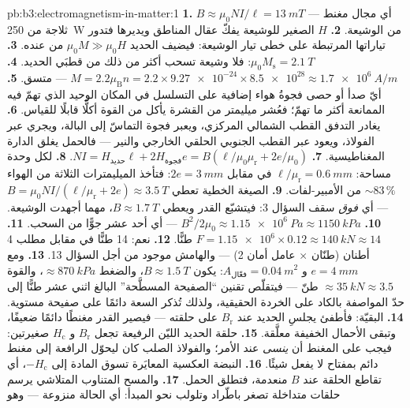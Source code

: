 \begin{solution}{pb:b3:electromagnetism-in-matter:1}
\textbf{1.} $B \approx \mu_0NI/\ell = \qty{13}{mT}$ --- أي
مجال مغنط ثلاجة من \qty{250}{W} من الوشيعة.
\textbf{2.} $H$ الصغير للوشيعة يفكّ عقال المناطق ويديرها فتدور
تياراتها المرتبطة على خطى تيار الوشيعة: فيضيف الحديد
$\mu_0M \gg \mu_0H$ من عنده.
\textbf{3.} $\mu_0M_{\text{s}} = \qty{2.1}{T}$: فلا وشيعة تسحب
أكثر من ذلك من قطبَي الحديد.
\textbf{4.} $M = 2.2\mu_{\text{B}}n = 2.2\times\num{9.27e-24}
\times\num{8.5e28} \approx \qty{1.7e6}{A/m}$ --- متسق.
\textbf{5.} أيّ صدأ أو حصى فجوةُ هواء إضافية على التسلسل في المكان
الوحيد الذي تهمّ فيه الممانعة أكثر ما تهمّ؛ فعُشر ميليمتر من القشرة
يأكل من القوة أكلًّا قابلًا للقياس.
\textbf{6.} يغادر التدفق القطب الشمالي المركزي، ويعبر
فجوة التماسّ إلى البالة، ويجري عبر الفولاذ، ويعود
عبر القطب الجنوبي الحلقي الخارجي والنير --- فالحمل
يغلق الدارة المغناطيسية.
\textbf{7.} $NI = H_{\text{حديد}}\ell + 2H_{\text{فجوة}}e =
B(\ell/\mu_0\mu_{\text{r}} + 2e/\mu_0)$.
\textbf{8.} لكل وحدة مساحة: $\ell/\mu_{\text{r}} = \qty{0.6}{mm}$
في مقابل $2e = \qty{3}{mm}$: فتأخذ الميليمترات الثلاثة من الهواء
$\sim83\,\%$ من الأمبير-لفات.
\textbf{9.} الصيغة الخطية تعطي $B = \mu_0NI/(\ell/
\mu_{\text{r}} + 2e) \approx \qty{3.5}{T}$ --- أي \emph{فوق}
سقف السؤال 3: فيتشبّع القدر ويعطي $B \approx
\qty{1.7}{T}$، مهما أجهدت الوشيعة.
\textbf{10.} $B^2/2\mu_0 \approx \qty{1.15e6}{Pa} \approx
\qty{1150}{kPa}$ --- أي أحد عشر جوًّا من السحب.
\textbf{11.} $F = \num{1.15e6}\times0.12 \approx \qty{140}{kN}
\approx 14$ طنًّا.
\textbf{12.} نعم: 14 طنًّا في مقابل مطلب 4 أطنان
(طنّان $\times$ عامل أمان 2) --- والهامش موجود من أجل
السؤال 13.
\textbf{13.} ومع $e = \qty{4}{mm}$ و $A_{\text{فعّال}} =
\qty{0.04}{m^2}$: يكون $B \approx \qty{1.5}{T}$، والضغط
$\approx\qty{870}{kPa}$، والقوة $\approx\qty{35}{kN} \approx 3.5$
طنّ --- فيتقلّص تقنين ``الصفيحة المسطَّحة'' البالغ اثني عشر طنًّا إلى
حدّ المواصفة بالكاد على الخردة الحقيقية، ولذلك تُذكر السعة دائمًا
على صفيحة مستوية.
\textbf{14.} البقيّة: فأطفئ يجلسِ الحديد عند
$B_{\text{r}}$ على حلقته --- فيصير القدر مغنطًا دائمًا ضعيفًا،
وتبقى الأحمال الخفيفة معلَّقة.
\textbf{15.} حلقة الحديد الليّن الرفيعة تجعل $B_{\text{r}}$ و
$H_{\text{c}}$ صغيرتين: فيجب على المغنط أن \emph{ينسى} عند الأمر؛
والفولاذ الصلب كان ليحوّل الرافعة إلى مغنط دائم بمفتاح
لا يفعل شيئًا.
\textbf{16.} النبضة العكسية المعايَرة تسوق المادة إلى
$-H_{\text{c}}$، أي تقاطع الحلقة عند $B$ منعدمة، فتطلق
الحمل.
\textbf{17.} والمسح المتناوب المتلاشي يرسم حلقات متداخلة تصغر باطّراد
وتلولب نحو المبدأ: أي الحالة منزوعة  --- وهو

\end{solution}
